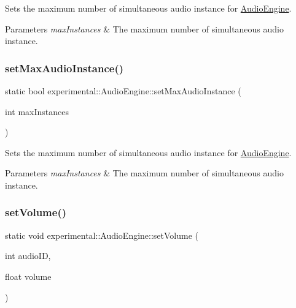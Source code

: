 Sets the maximum number of simultaneous audio instance for \hyperlink{classexperimental_1_1AudioEngine}{Audio\+Engine}.


\begin{DoxyParams}{Parameters}
{\em max\+Instances} & The maximum number of simultaneous audio instance. \\
\hline
\end{DoxyParams}
\mbox{\label{classexperimental_1_1AudioEngine_a98a3cd56d393541c2c9d82620bbe0d84}} 
\subsubsection{\texorpdfstring{set\+Max\+Audio\+Instance()}{setMaxAudioInstance()}\hspace{0.1cm}{\footnotesize\ttfamily [2/2]}}
{\footnotesize\ttfamily static bool experimental\+::\+Audio\+Engine\+::set\+Max\+Audio\+Instance (\begin{DoxyParamCaption}\item[{int}]{max\+Instances }\end{DoxyParamCaption})\hspace{0.3cm}{\ttfamily [static]}}

Sets the maximum number of simultaneous audio instance for \hyperlink{classexperimental_1_1AudioEngine}{Audio\+Engine}.


\begin{DoxyParams}{Parameters}
{\em max\+Instances} & The maximum number of simultaneous audio instance. \\
\hline
\end{DoxyParams}
\mbox{\label{classexperimental_1_1AudioEngine_a6759e7f6b0e2da64523949cf361a083e}} 
\subsubsection{\texorpdfstring{set\+Volume()}{setVolume()}\hspace{0.1cm}{\footnotesize\ttfamily [1/2]}}
{\footnotesize\ttfamily static void experimental\+::\+Audio\+Engine\+::set\+Volume (\begin{DoxyParamCaption}\item[{int}]{audio\+ID,  }\item[{float}]{volume }\end{DoxyParamCaption})\hspace{0.3cm}{\ttfamily [static]}}

